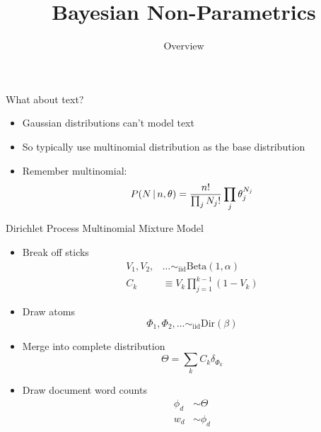 \documentclass[compress]{beamer}
\title{Bayesian Non-Parametrics}
\date{Overview}
\begin{document}
\frame{\titlepage
}

\begin{frame}{What about text?}

  \begin{itemize}
    \item Gaussian distributions can't model text 
    \item So typically use multinomial distribution as the base distribution
    \item Remember multinomial:
      \begin{equation}
        P(N \, | \, n, \theta) = \frac{n!}{\prod_j N_j!} \prod_j \theta_j^{N_j}
      \end{equation}
  \end{itemize}

\end{frame}

\begin{frame}{Dirichlet Process Multinomial Mixture Model}
\begin{footnotesize}
       \begin{itemize}
		\item Break off sticks
                  \begin{align}
                    V_1, V_2, & \dots \sim_{\mbox{iid}} \mbox{Beta}(1,
                    \alpha) \\
                    C_k & \equiv V_k \prod_{j=1}^{k-1} (1 - V_k)
                  \end{align}
		\pause
		\item Draw atoms
                  \begin{equation}
                    \Phi_1, \Phi_2, \dots \sim_{\mbox{iid}} \mbox{Dir}(\beta)
                  \end{equation}
		\pause
		\item Merge into complete distribution
                  \begin{equation}
                    \Theta = \sum_k C_k \delta_{\Phi_k}
                  \end{equation}
                  \pause
                  \item Draw document word counts
                    \begin{align}
                      \phi_d & \sim \Theta \\
                      w_d & \sim \phi_d  
                    \end{align}
       \end{itemize}
\end{footnotesize}
\end{frame}
\end{document}
